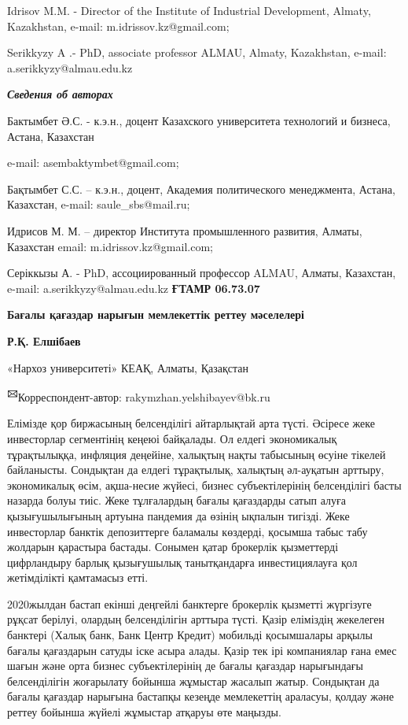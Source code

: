 Idrisov M.M. - Director of the Institute of Industrial Development,
Almaty, Kazakhstan, e-mail: m.idrissov.kz@gmail.com;

Serikkyzy A .- PhD, associate professor ALMAU, Almaty, Kazakhstan,
e-mail: a.serikkyzy@almau.edu.kz

\emph{{\bfseries Сведения об авторах}}

Бактымбет Ә.С. - к.э.н., доцент Казахского университета технологий и
бизнеса, Астана, Казахстан

e-mail: asembaktymbet@gmail.com;

Бақтымбет С.С. -- к.э.н., доцент, Академия политического менеджмента,
Астана, Казахстан, e-mail: saule\_sbs@mail.ru;

Идрисов М. М. -- директор Института промышленного развития, Алматы,
Казахстан email: m.idrissov.kz@gmail.com;

Серіккызы А. - PhD, ассоциированный профессор ALMAU, Алматы, Казахстан,
e-mail: a.serikkyzy@almau.edu.kz\newpage
{\bfseries ҒТАМР 06.73.07}

{\bfseries Бағалы қағаздар нарығын мемлекеттік реттеу мәселелері}

{\bfseries Р.Қ. Елшібаев}

«Нархоз университеті» КЕАҚ, Алматы, Қазақстан

{\bfseries \textsuperscript{🖂}}Корреспондент-автор:
rakymzhan.yelshibayev@bk.ru

Елімізде қор биржасының белсенділігі айтарлықтай арта түсті. Әсіресе
жеке инвесторлар сегментінің кеңеюі байқалады. Ол елдегі экономикалық
тұрақтылыққа, инфляция деңейіне, халықтың нақты табысының өсуіне тікелей
байланысты. Сондықтан да елдегі тұрақтылық, халықтың әл-ауқатын арттыру,
экономикалық өсім, ақша-несие жүйесі, бизнес субъектілерінің
белсенділігі басты назарда болуы тиіс. Жеке тұлғалардың бағалы
қағаздарды сатып алуға қызығушылығының артуына пандемия да өзінің
ықпалын тигізді. Жеке инвесторлар банктік депозиттерге баламалы
көздерді, қосымша табыс табу жолдарын қарастыра бастады. Сонымен қатар
брокерлік қызметтерді цифрландыру барлық қызығушылық танытқандарға
инвестициялауға қол жетімділікті қамтамасыз етті.

2020жылдан бастап екінші деңгейлі банктерге брокерлік қызметті жүргізуге
рұқсат берілуі, олардың белсенділігін арттыра түсті. Қазір еліміздің
жекелеген банктері (Халық банк, Банк Центр Кредит) мобильді қосымшалары
арқылы бағалы қағаздарын сатуды іске асыра алады. Қазір тек ірі
компаниялар ғана емес шағын және орта бизнес субъектілерінің де бағалы
қағаздар нарығындағы белсенділігін жоғарылату бойынша жұмыстар жасалып
жатыр. Сондықтан да бағалы қағаздар нарығына бастапқы кезеңде
мемлекеттің араласуы, қолдау және реттеу бойынша жүйелі жұмыстар атқаруы
өте маңызды.

